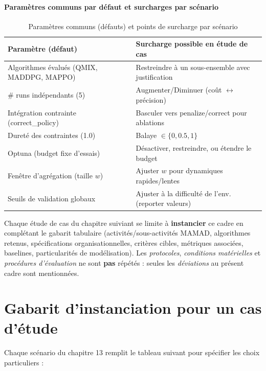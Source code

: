 \paragraph{Paramètres communs par défaut et surcharges par scénario}
\begin{table}[h!]
  \centering
  \caption{Paramètres communs (défauts) et points de surcharge par scénario}
  {%

    \footnotesize
    \begin{tabular}{p{5.2cm}p{7.2cm}}
      \hline
      \textbf{Paramètre (défaut)}               & \textbf{Surcharge possible en étude de cas}           \\
      \hline
      Algorithmes évalués (QMIX, MADDPG, MAPPO) & Restreindre à un sous-ensemble avec justification     \\
      \# runs indépendants (5)                  & Augmenter/Diminuer (coût $\leftrightarrow$ précision) \\
      Intégration contrainte (correct\_policy)  & Basculer vers penalize/correct pour ablations         \\
      Dureté des contraintes (1.0)              & Balaye $\in \{0, 0.5, 1\}$                            \\
      Optuna (budget fixe d’essais)             & Désactiver, restreindre, ou étendre le budget         \\
      Fenêtre d’agrégation (taille $w$)         & Ajuster $w$ pour dynamiques rapides/lentes            \\
      Seuils de validation globaux              & Ajuster à la difficulté de l’env. (reporter valeurs)  \\
      \hline
    \end{tabular}
  }
\end{table}

Chaque étude de cas du chapitre suiviant se limite à \textbf{instancier} ce cadre en complétant le gabarit tabulaire (activités/sous-activités MAMAD, algorithmes retenus, spécifications organisationnelles, critères cibles, métriques associées, baselines, particularités de modélisation). Les \textit{protocoles}, \textit{conditions matérielles} et \textit{procédures d’évaluation} ne sont \textbf{pas} répétés : seules les \textit{déviations} au présent cadre sont mentionnées.


\section{Gabarit d’instanciation pour un cas d’étude}
Chaque scénario du chapitre 13 remplit le tableau suivant pour spécifier les choix particuliers :

